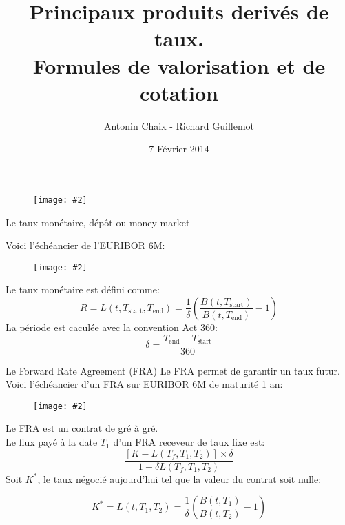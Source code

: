\documentclass{beamer}
\title[Pdts dérivés de taux]{Principaux produits derivés de taux. \\ Formules de valorisation et de cotation}
\author{Antonin Chaix - Richard Guillemot}
\institute{Master IFMA}
\date{7 Février 2014}
\newcommand{\FIG}[2]{\texttt{[image: \#2]}}
\begin{document}
\begin{frame}
\titlepage
\begin{figure}[h]
\centering \FIG{5cm}{figures/UPMC_IFMA.jpg}
\end{figure}

\end{frame}

\begin{frame}{Le taux monétaire, dépôt ou money market}

Voici l'échéancier de l'EURIBOR 6M:
\begin{figure}[h]
\vspace{2mm}
\FIG{7cm}{figures/schema_euribor.jpg} 
\vspace{1mm}
\end{figure}
Le taux monétaire est défini comme:
\[
R=L(t,T_\text{start}, T_\text{end})=\frac{1}{\delta}\left(\frac{B(t,T_\text{start})}{B(t,T_\text{end})}-1\right)
\]
La période est caculée avec la convention Act 360:
\[
\delta = \frac{T_\text{end} - T_\text{start}} {360}
\]
\end{frame}

\begin{frame}{Le Forward Rate Agreement (FRA)}
Le FRA permet de garantir un taux futur.\\
Voici l'échéancier d'un FRA sur EURIBOR 6M de maturité 1 an:
\begin{figure}[h]
\FIG{7cm}{figures/schema_fra.jpg} 
\end{figure}
Le FRA est un contrat de gré à gré.\\
Le flux payé à la date $T_1$ d'un FRA receveur de taux fixe est:
\[
\frac{[K-L(T_f,T_1,T_2)]\times\delta}{1+\delta L(T_f,T_1,T_2)}
\]
Soit $K^*$, le taux négocié aujourd'hui tel que la valeur du contrat soit nulle:

\[
K^*=L(t,T_1, T_2)=\frac{1}{\delta}\left(\frac{B(t,T_1)}{B(t,T_2)}-1\right)
\]
\end{frame}
\end{document}
